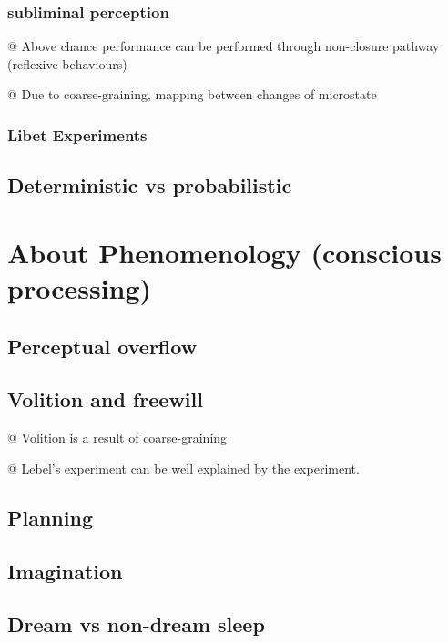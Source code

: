 \documentclass[utf8]{article}
\newenvironment{ants}
			{
			 \begin{easylist}[itemize]		
		 	}
			{
			\end{easylist}
			}
\begin{document}
		\subsubsection{subliminal perception}
		\begin{ants}
			@ Above chance performance can be performed through non-closure pathway (reflexive behaviours) 
			
			@ Due to coarse-graining, mapping between changes of microstate
		\end{ants}
		\subsubsection{Libet Experiments}		
		
		
		\subsection{Deterministic vs probabilistic}
		\cite{dehaene2017consciousness}
		\cite{vul2008temporal, moreno2011bayesian, asplund2014attentional, vul2009attention}


	\section*{About Phenomenology (conscious processing)}
\subsection{Perceptual overflow}
\subsection{Volition and freewill}
\begin{ants}
	@ Volition is a result of coarse-graining
	
	@ Lebel's experiment can be well explained by the experiment.
\end{ants}



\subsection{Planning}
\subsection{Imagination}
\subsection{Dream vs non-dream sleep}
\end{document}
